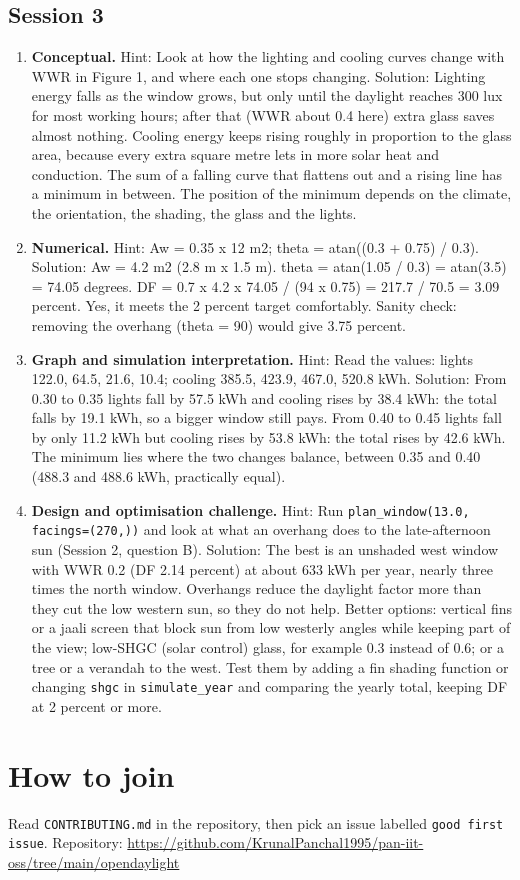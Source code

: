 \documentclass[11pt,a4paper]{article}
\begin{document}
\subsection*{Session 3}
\begin{enumerate}[nosep]
\item \textbf{Conceptual.} Hint: Look at how the lighting and cooling curves change with WWR in Figure 1, and where each one stops changing. Solution: Lighting energy falls as the window grows, but only until the daylight reaches 300 lux for most working hours; after that (WWR about 0.4 here) extra glass saves almost nothing. Cooling energy keeps rising roughly in proportion to the glass area, because every extra square metre lets in more solar heat and conduction. The sum of a falling curve that flattens out and a rising line has a minimum in between. The position of the minimum depends on the climate, the orientation, the shading, the glass and the lights.
\item \textbf{Numerical.} Hint: Aw = 0.35 x 12 m2; theta = atan((0.3 + 0.75) / 0.3). Solution: Aw = 4.2 m2 (2.8 m x 1.5 m). theta = atan(1.05 / 0.3) = atan(3.5) = 74.05 degrees. DF = 0.7 x 4.2 x 74.05 / (94 x 0.75) = 217.7 / 70.5 = 3.09 percent. Yes, it meets the 2 percent target comfortably. Sanity check: removing the overhang (theta = 90) would give 3.75 percent.
\item \textbf{Graph and simulation interpretation.} Hint: Read the values: lights 122.0, 64.5, 21.6, 10.4; cooling 385.5, 423.9, 467.0, 520.8 kWh. Solution: From 0.30 to 0.35 lights fall by 57.5 kWh and cooling rises by 38.4 kWh: the total falls by 19.1 kWh, so a bigger window still pays. From 0.40 to 0.45 lights fall by only 11.2 kWh but cooling rises by 53.8 kWh: the total rises by 42.6 kWh. The minimum lies where the two changes balance, between 0.35 and 0.40 (488.3 and 488.6 kWh, practically equal).
\item \textbf{Design and optimisation challenge.} Hint: Run \texttt{plan\_window(13.0, facings=(270,))} and look at what an overhang does to the late-afternoon sun (Session 2, question B). Solution: The best is an unshaded west window with WWR 0.2 (DF 2.14 percent) at about 633 kWh per year, nearly three times the north window. Overhangs reduce the daylight factor more than they cut the low western sun, so they do not help. Better options: vertical fins or a jaali screen that block sun from low westerly angles while keeping part of the view; low-SHGC (solar control) glass, for example 0.3 instead of 0.6; or a tree or a verandah to the west. Test them by adding a fin shading function or changing \texttt{shgc} in \texttt{simulate\_year} and comparing the yearly total, keeping DF at 2 percent or more.
\end{enumerate}

\section{How to join}
Read \texttt{CONTRIBUTING.md} in the repository, then pick an issue labelled \texttt{good first issue}. Repository: \url{https://github.com/KrunalPanchal1995/pan-iit-oss/tree/main/opendaylight}
\end{document}
